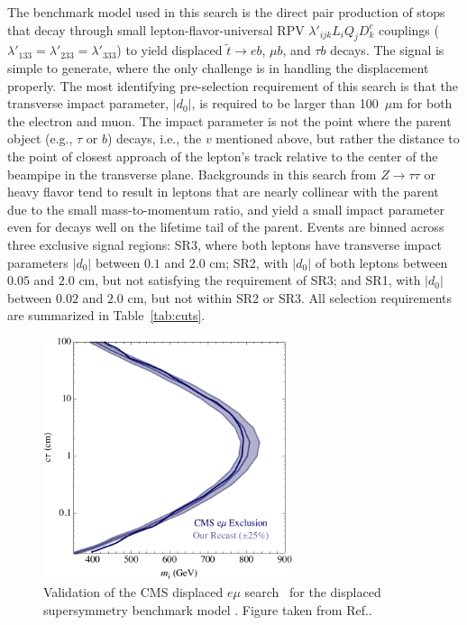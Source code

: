 \vspace{0.5cm}

The benchmark model used in this search is the direct pair production of stops
that decay through small lepton-flavor-universal RPV $\lambda'_{ijk}L_iQ_jD^c_k$
couplings ($\lambda'_{133}=\lambda'_{233}=\lambda'_{333}$) to yield displaced
$\tilde t \to e b$, $\mu b$, and $\tau b$ decays.  The signal is simple to
generate, where the only challenge is in handling the displacement properly. The most
identifying pre-selection requirement of this search is that the transverse
impact parameter, $|d_0|$, is required to be larger than 100~$\mu$m for both the
electron and muon. The impact parameter is not the point where the parent
object (e.g., $\tau$ or $b$) decays, i.e., the $v$ mentioned above, 
but rather the
distance to the point of closest approach of the lepton's track relative to the
center of the beampipe in the transverse plane. Backgrounds in this search from $Z\to\tau\tau$ or heavy
flavor tend to result in leptons that are nearly collinear with the parent due
to the small mass-to-momentum ratio, and yield a small impact parameter even for
decays well on the lifetime tail of the parent. Events are binned across three
exclusive signal regions: SR3, where both leptons have transverse impact
parameters $|d_0|$ between $0.1$ and $2.0$ cm; SR2, with $|d_0|$ of both
leptons between $0.05$ and $2.0$ cm, but not satisfying the requirement of SR3;
and SR1, with $|d_0|$ between $0.02$ and $2.0$ cm, but not within SR2
or SR3. All selection requirements are summarized in Table~\ref{tab:cuts}.

\begin{figure}[t]
\begin{center}
\includegraphics[width=0.65\textwidth,angle=0]{ch5-figures/emuVal.pdf}
\end{center}
\caption{Validation of the CMS displaced $e\mu$ search~\cite{Khachatryan:2014mea} for
  the displaced supersymmetry benchmark model
  \cite{Graham:2012th}.  Figure taken from Ref.\cite{Evans:2016zau}.
}
\label{fig:DTval}
\end{figure}


